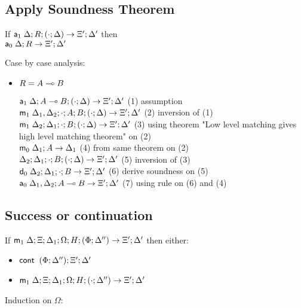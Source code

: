 \subsection{Apply Soundness Theorem}

If $\mathsf{a}_1 \; \Delta; R; (\cdot; \Delta) \rightarrow \Xi'; \Delta'$ then \\
      $\mathsf{a}_0 \; \Delta; R \rightarrow \Xi'; \Delta'$

Case by case analysis:

\begin{itemize}
\item $R = A \multimap B$

$\mathsf{a}_1 \; \Delta; A \multimap B ; (\cdot ; \Delta) \rightarrow \Xi'; \Delta'$ \hfill (1) assumption \\
$\mathsf{m}_1 \; \Delta_1, \Delta_2; \cdot; A ; B ; (\cdot ; \Delta) \rightarrow \Xi'; \Delta'$ \hfill (2) inversion of (1) \\
$\mathsf{m}_1 \; \Delta_2; \Delta_1; \cdot ; B ; (\cdot ; \Delta) \rightarrow \Xi'; \Delta'$ \hfill (3) using theorem "Low level matching gives high level matching theorem" on (2) \\
$\mathsf{m}_0 \; \Delta_1 ; A \rightarrow \Delta_1$ \hfill (4) from same theorem on (2) \\
$\do \Delta_2; \Delta_1; \cdot ; B ; (\cdot ; \Delta) \rightarrow \Xi'; \Delta'$ \hfill (5) inversion of (3) \\
$\mathsf{d}_0 \; \Delta_2; \Delta_1; \cdot ; B \rightarrow \Xi'; \Delta'$ \hfill (6) derive soundness on (5) \\
$\mathsf{a}_0 \; \Delta_1, \Delta_2; A \multimap B \rightarrow \Xi'; \Delta'$ \hfill (7) using rule on (6) and (4) \\
\end{itemize}

\subsection{Success or continuation}

If $\mathsf{m}_1 \; \Delta; \Xi; \Delta_1; \Omega; H; (\Phi; \Delta'') \rightarrow \Xi'; \Delta'$ then either:

\begin{itemize}
   \item $\mathsf{cont} \; \; (\Phi; \Delta''); \Xi'; \Delta'$
   \item $\mathsf{m}_1 \; \Delta; \Xi; \Delta_1; \Omega; H; (\cdot; \Delta'') \rightarrow \Xi'; \Delta'$
\end{itemize}

Induction on $\Omega$:

